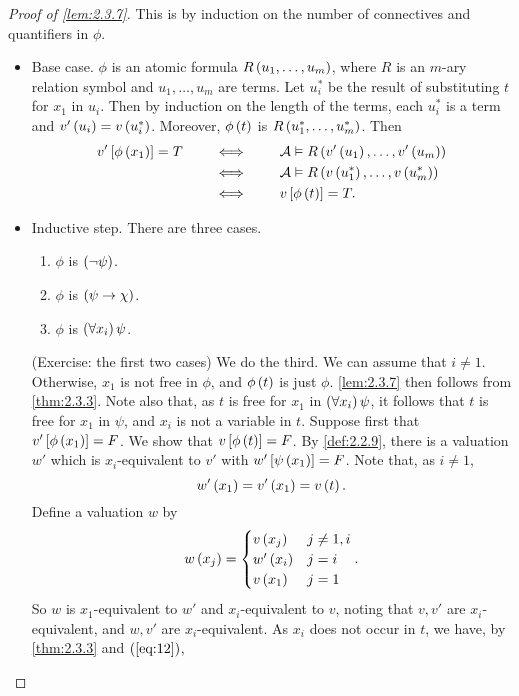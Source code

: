 \begin{proof}[Proof of \ref{lem:2.3.7}]
This is by induction on the number of connectives and quantifiers in $ \phi $.
\begin{itemize}
\item Base case. $ \phi $ is an atomic formula $ R\left( u_1, \dots, u_m \right) $, where $ R $ is an $ m $-ary relation symbol and $ u_1, \dots, u_m $ are terms. Let $ u^*_i $ be the result of substituting $ t $ for $ x_1 $ in $ u_i $. Then by induction on the length of the terms, each $ u_i^* $ is a term and $ v'\left( u_i \right) = v\left( u_i^* \right) $. Moreover, $ \phi\left( t \right) $ is $ R\left( u_1^*, \dots, u_m^* \right) $. Then
\begin{align*}
v'\left[ \phi\left( x_1 \right) \right] = T \qquad
& \iff \qquad \mathcal{A} \vDash R\left( v'\left( u_1 \right), \dots, v'\left( u_m \right) \right) \\
& \iff \qquad \mathcal{A} \vDash R\left( v\left( u_1^* \right), \dots, v\left( u_m^* \right) \right) \\
& \iff \qquad v\left[ \phi\left( t \right) \right] = T.
\end{align*}
\item Inductive step. There are three cases.
\begin{enumerate}[leftmargin=0.5in, label=Case \arabic*.]
\item $ \phi $ is $ \left( \neg \psi \right) $.
\item $ \phi $ is $ \left( \psi \rightarrow \chi \right) $.
\item $ \phi $ is $ \left( \forall x_i \right)\psi $.
\end{enumerate}
(Exercise: the first two cases) We do the third. We can assume that $ i \ne 1 $. Otherwise, $ x_1 $ is not free in $ \phi $, and $ \phi\left( t \right) $ is just $ \phi $. \ref{lem:2.3.7} then follows from \ref{thm:2.3.3}. Note also that, as $ t $ is free for $ x_1 $ in $ \left( \forall x_i \right)\psi $, it follows that $ t $ is free for $ x_1 $ in $ \psi $, and $ x_i $ is not a variable in $ t $. Suppose first that $ v'\left[ \phi\left( x_1 \right) \right] = F $. We show that $ v\left[ \phi\left( t \right) \right] = F $. By \ref{def:2.2.9}, there is a valuation $ w' $ which is $ x_i $-equivalent to $ v' $ with $ w'\left[ \psi\left( x_1 \right) \right] = F $. Note that, as $ i \ne 1 $,
\begin{equation}
\label{eq:12}
w'\left( x_1 \right) = v'\left( x_1 \right) = v\left( t \right).
\end{equation}
Define a valuation $ w $ by
$$ w\left( x_j \right) = \begin{cases}
v\left( x_j \right) & j \ne 1, i \\
w'\left( x_i \right) & j = i \\
v\left( x_1 \right) & j = 1
\end{cases}. $$
So $ w $ is $ x_1 $-equivalent to $ w' $ and $ x_i $-equivalent to $ v $, noting that $ v, v' $ are $ x_i $-equivalent, and $ w, v' $ are $ x_i $-equivalent. As $ x_i $ does not occur in $ t $, we have, by \ref{thm:2.3.3} and $ \left( \ref{eq:12} \right) $,

\end{itemize}
\end{proof}
